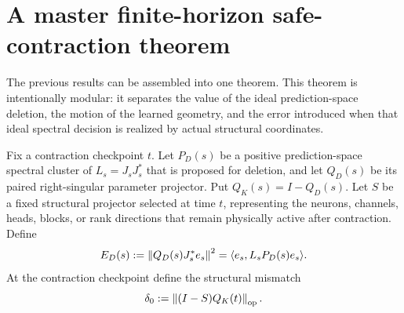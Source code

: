\section{A master finite-horizon safe-contraction theorem}
The previous results can be assembled into one theorem. This theorem is intentionally modular: it separates the value of the ideal prediction-space deletion, the motion of the learned geometry, and the error introduced when that ideal spectral decision is realized by actual structural coordinates.

Fix a contraction checkpoint $t$. Let $P_D(s)$ be a positive prediction-space spectral cluster of $L_s=J_sJ_s^\ast$ that is proposed for deletion, and let $Q_D(s)$ be its paired right-singular parameter projector. Put $Q_K(s)=I-Q_D(s)$. Let $S$ be a fixed structural projector selected at time $t$, representing the neurons, channels, heads, blocks, or rank directions that remain physically active after contraction. Define
\[
E_D(s)
:=\left\lVert Q_D(s)J_s^\ast e_s\right\rVert^2
=\langle e_s,L_sP_D(s)e_s\rangle.
\]
At the contraction checkpoint define the structural mismatch
\[
\delta_0:=\left\lVert (I-S)Q_K(t)\right\rVert_{\mathrm{op}}.
\]


